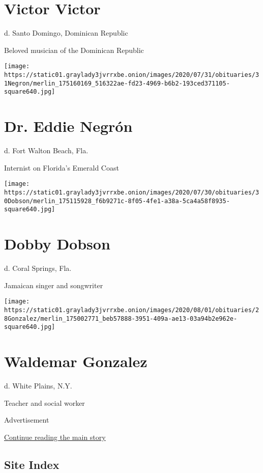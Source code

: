 \hypertarget{victor-victor}{%
\section{Victor Victor}\label{victor-victor}}

d. Santo Domingo, Dominican Republic

Beloved musician of the Dominican Republic

\texttt{[image: https://static01.graylady3jvrrxbe.onion/images/2020/07/31/obituaries/31Negron/merlin\_175160169\_516322ae-fd23-4969-b6b2-193ced371105-square640.jpg]}

\hypertarget{dr-eddie-negruxf3n}{%
\section{Dr. Eddie Negrón}\label{dr-eddie-negruxf3n}}

d. Fort Walton Beach, Fla.

Internist on Florida's Emerald Coast

\texttt{[image: https://static01.graylady3jvrrxbe.onion/images/2020/07/30/obituaries/30Dobson/merlin\_175115928\_f6b9271c-8f05-4fe1-a38a-5ca4a58f8935-square640.jpg]}

\hypertarget{dobby-dobson}{%
\section{Dobby Dobson}\label{dobby-dobson}}

d. Coral Springs, Fla.

Jamaican singer and songwriter

\texttt{[image: https://static01.graylady3jvrrxbe.onion/images/2020/08/01/obituaries/28Gonzalez/merlin\_175002771\_beb57888-3951-409a-ae13-03a94b2e962e-square640.jpg]}

\hypertarget{waldemar-gonzalez}{%
\section{Waldemar Gonzalez}\label{waldemar-gonzalez}}

d. White Plains, N.Y.

Teacher and social worker

Advertisement

\protect\hyperlink{after-bottom}{Continue reading the main story}

\hypertarget{site-index}{%
\subsection{Site Index}\label{site-index}}

